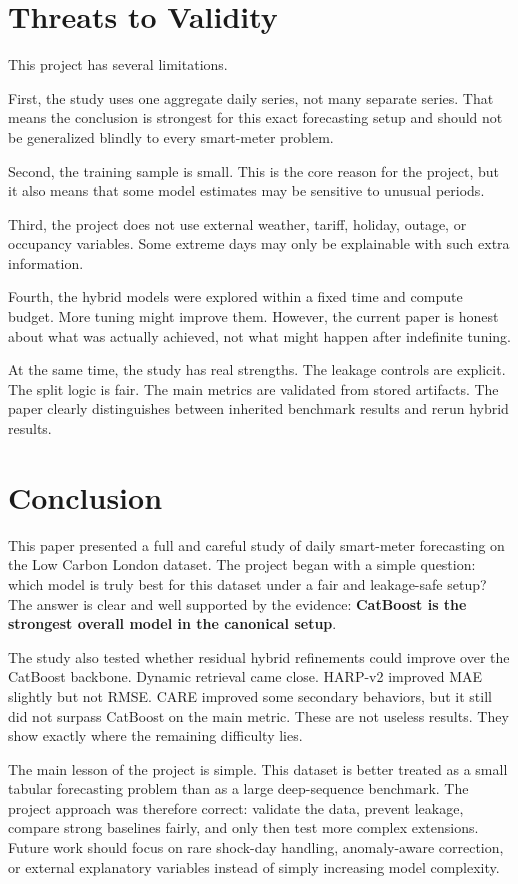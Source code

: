 \documentclass[conference]{IEEEtran}
\begin{document}
\section{Threats to Validity}
This project has several limitations.

First, the study uses one aggregate daily series, not many separate series. That means the conclusion is strongest for this exact forecasting setup and should not be generalized blindly to every smart-meter problem.

Second, the training sample is small. This is the core reason for the project, but it also means that some model estimates may be sensitive to unusual periods.

Third, the project does not use external weather, tariff, holiday, outage, or occupancy variables. Some extreme days may only be explainable with such extra information.

Fourth, the hybrid models were explored within a fixed time and compute budget. More tuning might improve them. However, the current paper is honest about what was actually achieved, not what might happen after indefinite tuning.

At the same time, the study has real strengths. The leakage controls are explicit. The split logic is fair. The main metrics are validated from stored artifacts. The paper clearly distinguishes between inherited benchmark results and rerun hybrid results.

\section{Conclusion}
This paper presented a full and careful study of daily smart-meter forecasting on the Low Carbon London dataset. The project began with a simple question: which model is truly best for this dataset under a fair and leakage-safe setup? The answer is clear and well supported by the evidence: \textbf{CatBoost is the strongest overall model in the canonical setup}.

The study also tested whether residual hybrid refinements could improve over the CatBoost backbone. Dynamic retrieval came close. HARP-v2 improved MAE slightly but not RMSE. CARE improved some secondary behaviors, but it still did not surpass CatBoost on the main metric. These are not useless results. They show exactly where the remaining difficulty lies.

The main lesson of the project is simple. This dataset is better treated as a small tabular forecasting problem than as a large deep-sequence benchmark. The project approach was therefore correct: validate the data, prevent leakage, compare strong baselines fairly, and only then test more complex extensions. Future work should focus on rare shock-day handling, anomaly-aware correction, or external explanatory variables instead of simply increasing model complexity.



\end{document}
